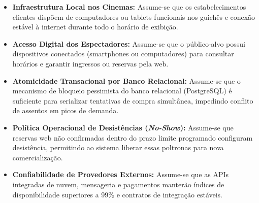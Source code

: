 \begin{itemize}
\tightlist
\item \textbf{Infraestrutura Local nos Cinemas:} Assume-se que os estabelecimentos clientes dispõem de computadores ou tablets funcionais nos guichês e conexão estável à internet durante todo o horário de exibição.
\item \textbf{Acesso Digital dos Espectadores:} Assume-se que o público-alvo possui dispositivos conectados (smartphones ou computadores) para consultar horários e garantir ingressos ou reservas pela web.
\item \textbf{Atomicidade Transacional por Banco Relacional:} Assume-se que o mecanismo de bloqueio pessimista do banco relacional (PostgreSQL) é suficiente para serializar tentativas de compra simultânea, impedindo conflito de assentos em picos de demanda.
\item \textbf{Política Operacional de Desistências (\emph{No-Show}):} Assume-se que reservas web não confirmadas dentro do prazo limite programado configuram desistência, permitindo ao sistema liberar essas poltronas para nova comercialização.
\item \textbf{Confiabilidade de Provedores Externos:} Assume-se que as APIs integradas de nuvem, mensageria e pagamentos manterão índices de disponibilidade superiores a 99\% e contratos de integração estáveis.
\end{itemize}
